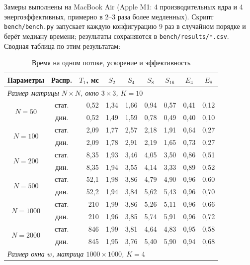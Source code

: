 \documentclass[12pt,a4paper]{article}
\begin{document}
Замеры выполнены на MacBook Air (Apple M1: 4 производительных ядра и
4 энергоэффективных, примерно в 2--3 раза более медленных). Скрипт
\texttt{bench/bench.py} запускает каждую конфигурацию 9 раз в случайном
порядке и берёт медиану времени; результаты сохраняются в
\texttt{bench/results/*.csv}. Сводная таблица по этим результатам:

\begin{table}[H]
\centering
\caption{Время на одном потоке, ускорение и эффективность}
\label{tab:speedup}
\begin{tabular}{|c|c|r|c|c|c|c||c|c|}
\hline
\rowcolor{lightgray}
\textbf{Параметры} & \textbf{Распр.} & \textbf{$T_1$, мс} & \textbf{$S_2$} & \textbf{$S_4$} &
\textbf{$S_8$} & \textbf{$S_{16}$} & \textbf{$E_4$} & \textbf{$E_8$} \\
\hline
\multicolumn{9}{|l|}{\textit{Размер матрицы $N \times N$, окно $3 \times 3$, $K = 10$}} \\
\hline
\multirow{2}{*}{$N = 50$} & стат. & 0{,}52 & 1{,}34 & 1{,}66 & 0{,}94 & 0{,}57 & 0{,}41 & 0{,}12 \\
 & дин. & 0{,}52 & 1{,}49 & 1{,}59 & 0{,}78 & 0{,}49 & 0{,}40 & 0{,}10 \\
\hline
\multirow{2}{*}{$N = 100$} & стат. & 2{,}09 & 1{,}77 & 2{,}57 & 2{,}18 & 1{,}91 & 0{,}64 & 0{,}27 \\
 & дин. & 2{,}09 & 1{,}78 & 2{,}91 & 2{,}19 & 1{,}65 & 0{,}73 & 0{,}27 \\
\hline
\multirow{2}{*}{$N = 200$} & стат. & 8{,}35 & 1{,}93 & 3{,}46 & 4{,}05 & 3{,}50 & 0{,}86 & 0{,}51 \\
 & дин. & 8{,}35 & 1{,}94 & 3{,}55 & 4{,}14 & 3{,}33 & 0{,}89 & 0{,}52 \\
\hline
\multirow{2}{*}{$N = 500$} & стат. & 52{,}1 & 1{,}98 & 3{,}86 & 4{,}79 & 4{,}90 & 0{,}96 & 0{,}60 \\
 & дин. & 52{,}2 & 1{,}94 & 3{,}84 & 5{,}62 & 5{,}43 & 0{,}96 & 0{,}70 \\
\hline
\multirow{2}{*}{$N = 1000$} & стат. & 210 & 1{,}99 & 3{,}86 & 5{,}26 & 5{,}11 & 0{,}96 & 0{,}66 \\
 & дин. & 210 & 1{,}96 & 3{,}85 & 5{,}74 & 5{,}91 & 0{,}96 & 0{,}72 \\
\hline
\multirow{2}{*}{$N = 2000$} & стат. & 846 & 1{,}99 & 3{,}81 & 4{,}64 & 4{,}83 & 0{,}95 & 0{,}58 \\
 & дин. & 845 & 1{,}95 & 3{,}76 & 5{,}40 & 5{,}90 & 0{,}94 & 0{,}68 \\
\hline
\multicolumn{9}{|l|}{\textit{Размер окна $w$, матрица $1000 \times 1000$, $K = 4$}} \\

\end{tabular}
\end{table}
\end{document}
